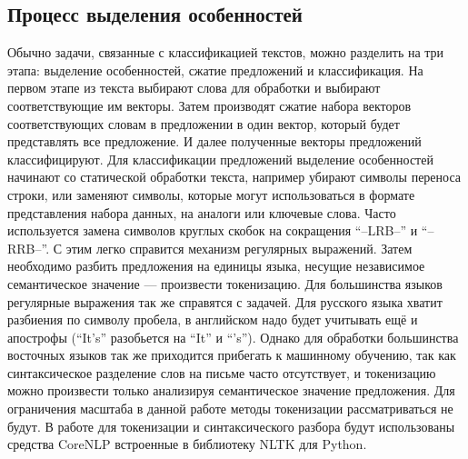 \subsection{Процесс выделения особенностей}\label{subsec:overview:overview_feature_extraction}
Обычно задачи, связанные с классификацией текстов, можно разделить на три этапа: выделение особенностей, сжатие предложений и классификация. На первом этапе из текста выбирают слова для обработки и выбирают соответствующие им векторы. Затем производят сжатие набора векторов соответствующих словам в предложении в один вектор, который будет представлять все предложение. И далее полученные векторы предложений классифицируют\cite{Goodfellow-et-al-2016}.
Для классификации предложений выделение особенностей начинают со статической обработки текста, например убирают символы переноса строки, или заменяют символы, которые могут использоваться в формате представления набора данных, на аналоги или ключевые слова. Часто используется замена символов круглых скобок на сокращения ``--LRB--'' и ``--RRB--''. С этим легко справится механизм регулярных выражений. Затем необходимо разбить предложения на единицы языка, несущие независимое семантическое значение --- произвести токенизацию. Для большинства языков регулярные выражения так же справятся с задачей. Для русского языка хватит разбиения по символу пробела, в английском надо будет учитывать ещё и апострофы (``It's'' разобьется на ``It'' и ``'s''). Однако для обработки большинства восточных языков так же приходится прибегать к машинному обучению, так как синтаксическое разделение слов на письме часто отсутствует, и токенизацию можно произвести только анализируя семантическое значение предложения. Для ограничения масштаба в данной работе методы токенизации рассматриваться не будут\cite{Goodfellow-et-al-2016}.
В работе для токенизации и синтаксического разбора будут использованы средства CoreNLP встроенные в библиотеку NLTK для Python.

